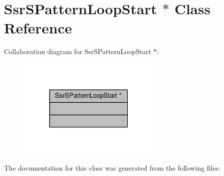 \hypertarget{classSsrSPatternLoopStart_01_5}{}\section{Ssr\+S\+Pattern\+Loop\+Start $\ast$ Class Reference}
\label{classSsrSPatternLoopStart_01_5}


Collaboration diagram for Ssr\+S\+Pattern\+Loop\+Start $\ast$\+:\nopagebreak
\begin{figure}[H]
\begin{center}
\leavevmode
\includegraphics[width=199pt]{classSsrSPatternLoopStart_01_5__coll__graph}
\end{center}
\end{figure}


The documentation for this class was generated from the following files\+: